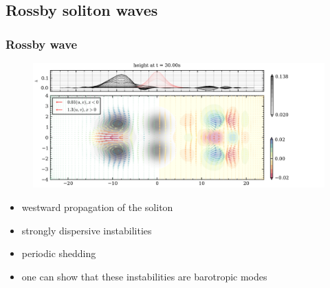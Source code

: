 \documentclass[numbering=fraction]{beamer}
\begin{document}
\subsection{Rossby soliton waves}

\begin{frame}
    \frametitle{Rossby wave}

    \begin{figure}[H]
        \centering
        \includegraphics[width=\textwidth]{./figure/soliton.png}
    \end{figure}
    \begin{itemize}
        \item westward propagation of the soliton
        \item strongly dispersive instabilities
        \item periodic shedding
        \item one can show that these instabilities are barotropic modes
    \end{itemize}
\end{frame}
\end{document}
